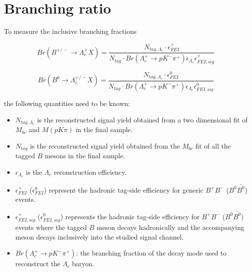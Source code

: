 \chapter{Branching ratio}
To measure the inclusive branching fractions

\begin{equation}
    Br(B^{+/-} \rightarrow \Lambda_c^{+} X) = \frac{ N_{tag, \Lambda_c} \cdot  \epsilon^{+}_{FEI}}{N_{tag} \cdot Br(\Lambda_c^+ \rightarrow  p K^- \pi^+) \epsilon_{\Lambda_c} \epsilon^{+}_{FEI,  sig }}
\end{equation}\label{eq:chargedB_BRformula}

\begin{equation}
    Br(B^{0} \rightarrow \Lambda_c^{+/-} X) = \frac{ N_{tag, \Lambda_c} \cdot  \epsilon^{0}_{FEI}}{N_{tag} \cdot Br(\Lambda_c^+ \rightarrow  p K^- \pi^+) \epsilon_{\Lambda_c} \epsilon^{0}_{FEI,  sig }}
\end{equation}\label{eq:B0_BRformula}

the following quantities need to be known: 
\begin{itemize}

\item $N_{tag, \Lambda_c} $ is the reconstructed signal yield obtained from a two dimensional fit of $M_{bc}$ and $M(p K \pi)$ in the final sample.
\item ${N_{tag}}$ is the reconstructed signal yield obtained from the $M_{bc}$ fit of all the tagged $B$ mesons in the final sample.
\item $\epsilon_{\Lambda_c} $ is the $\Lambda_c$ reconstruction efficiency.
\item $\epsilon^{+}_{FEI}$ ($\epsilon^{0}_{FEI}$) represent the hadronic tag-side efficiency for generic $B^+B^- $ ($B^0\bar{B^0}$) events. 
\item $\epsilon^{+}_{FEI,  sig}$ ($\epsilon^{0}_{FEI,  sig }$) represents the hadronic tag-side efficiency for  $B^+B^-$ ($B^0\bar{B^0}$) events where the tagged $B$ meson decays hadronically and the accompanying meson decays inclusively into the studied signal channel. 
\item  $Br(\Lambda_c^+ \rightarrow  p K^- \pi^+) $: the branching fraction of the decay mode used to reconstruct the  $\Lambda_c$ baryon.
\end{itemize}
\vspace{0.2 cm}


